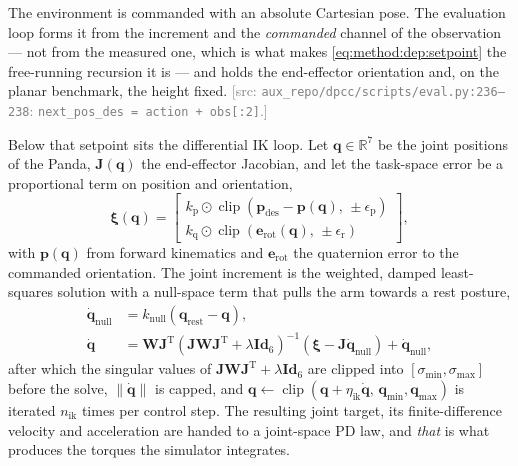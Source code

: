 \documentclass[headsepline,footsepline,footinclude=false,oneside,fontsize=11pt,paper=a4,listof=totoc,bibliography=totoc]{scrbook}
\theoremstyle{definition}
\theoremstyle{plain}
\theoremstyle{remark}
\newcommand{\vect}[1]{\boldsymbol{#1}}
\newcommand{\matr}[1]{\boldsymbol{#1}}
\newcommand{\trans}{^{\textrm{T}}}
\newcommand{\sidx}[1]{_{\textrm{#1}}}
\newcommand{\Id}[1]{\textbf{Id}_{#1}}
\newcommand{\R}{\mathbb{R}}                    %
\newif\ifsubmission
\newcommand{\srcnote}[1]{\ifsubmission\else\textcolor{gray}{\footnotesize\textsf{[src: #1]}}\fi}
\begin{document}
The environment is commanded with an absolute Cartesian pose. The evaluation loop forms it from the
increment and the \emph{commanded} channel of the observation --- not from the measured one, which
is what makes \eqref{eq:method:dep:setpoint} the free-running recursion it is --- and holds the
end-effector orientation and, on the planar benchmark, the height fixed.
\srcnote{\texttt{aux\_repo/dpcc/scripts/eval.py:236--238}: \texttt{next\_pos\_des = action + obs[:2]}.}

Below that setpoint sits the differential \ac{IK} loop. Let $\vect{q}\in\R^{7}$ be the joint
positions of the Panda, $\matr{J}(\vect{q})$ the end-effector Jacobian, and let the task-space error be a
proportional term on position and orientation,
\begin{equation}\label{eq:method:dep:taskerr}
  \vect{\xi}(\vect{q})
  = \begin{bmatrix}
      k\sidx{p}\odot\operatorname{clip}\!\left(\vect{p}\sidx{des}-\vect{p}(\vect{q}),\,\pm\epsilon\sidx{p}\right)\\[2pt]
      k\sidx{q}\odot\operatorname{clip}\!\left(\vect{e}\sidx{rot}(\vect{q}),\,\pm\epsilon\sidx{r}\right)
    \end{bmatrix},
\end{equation}
with $\vect{p}(\vect{q})$ from forward kinematics and $\vect{e}\sidx{rot}$ the quaternion error to the
commanded orientation. The joint increment is the weighted, damped least-squares solution with a
null-space term that pulls the arm towards a rest posture,
\begin{align}
  \dot{\vect{q}}\sidx{null} &= k\sidx{null}\left(\vect{q}\sidx{rest}-\vect{q}\right),
    \label{eq:method:dep:null}\\
  \dot{\vect{q}}
    &= \matr{W}\matr{J}\trans
       \left(\matr{J}\matr{W}\matr{J}\trans + \lambda\Id{6}\right)^{-1}
       \left(\vect{\xi} - \matr{J}\dot{\vect{q}}\sidx{null}\right)
     + \dot{\vect{q}}\sidx{null},
    \label{eq:method:dep:dls}
\end{align}
after which the singular values of $\matr{J}\matr{W}\matr{J}\trans + \lambda\Id{6}$ are clipped into
$[\sigma\sidx{min},\sigma\sidx{max}]$ before the solve, $\|\dot{\vect{q}}\|$ is capped, and
$\vect{q} \leftarrow \operatorname{clip}(\vect{q}+\eta\sidx{ik}\dot{\vect{q}},\,\vect{q}\sidx{min},\vect{q}\sidx{max})$
is iterated $n\sidx{ik}$ times per control step. The resulting joint target, its finite-difference
velocity and acceleration are handed to a joint-space PD law, and \emph{that} is what produces the
torques the simulator integrates.
\end{document}
